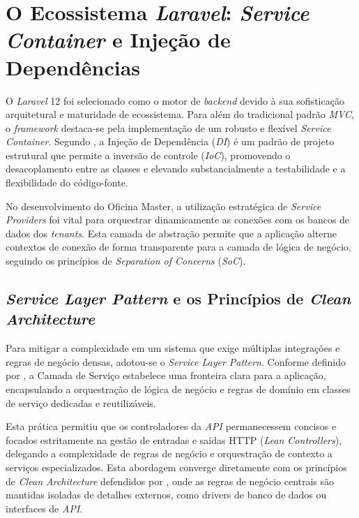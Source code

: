 \section{O Ecossistema \textit{Laravel}: \textit{Service Container} e Injeção de Dependências}

O \textit{Laravel} 12 foi selecionado como o motor de \textit{backend} devido à sua sofisticação arquitetural e maturidade de ecossistema. Para além do tradicional padrão \textit{MVC}, o \textit{framework} destaca-se pela implementação de um robusto e flexível \textit{Service Container}. Segundo , a Injeção de Dependência (\textit{DI}) é um padrão de projeto estrutural que permite a inversão de controle (\textit{IoC}), promovendo o desacoplamento entre as classes e elevando substancialmente a testabilidade e a flexibilidade do código-fonte.

No desenvolvimento do Oficina Master, a utilização estratégica de \textit{Service Providers} foi vital para orquestrar dinamicamente as conexões com os bancos de dados dos \textit{tenants}. Esta camada de abstração permite que a aplicação alterne contextos de conexão de forma transparente para a camada de lógica de negócio, seguindo os princípios de \textit{Separation of Concerns} (\textit{SoC}).

\subsection{\textit{Service Layer Pattern} e os Princípios de \textit{Clean Architecture}}

Para mitigar a complexidade em um sistema que exige múltiplas integrações e regras de negócio densas, adotou-se o \textit{Service Layer Pattern}. Conforme definido por , a Camada de Serviço estabelece uma fronteira clara para a aplicação, encapsulando a orquestração de lógica de negócio e regras de domínio em classes de serviço dedicadas e reutilizáveis. 

Esta prática permitiu que os controladores da \textit{API} permanecessem concisos e focados estritamente na gestão de entradas e saídas HTTP (\textit{Lean Controllers}), delegando a complexidade de regras de negócio e orquestração de contexto a serviços especializados. Esta abordagem converge diretamente com os princípios de \textit{Clean Architecture} defendidos por , onde as regras de negócio centrais são mantidas isoladas de detalhes externos, como drivers de banco de dados ou interfaces de \textit{API}.

